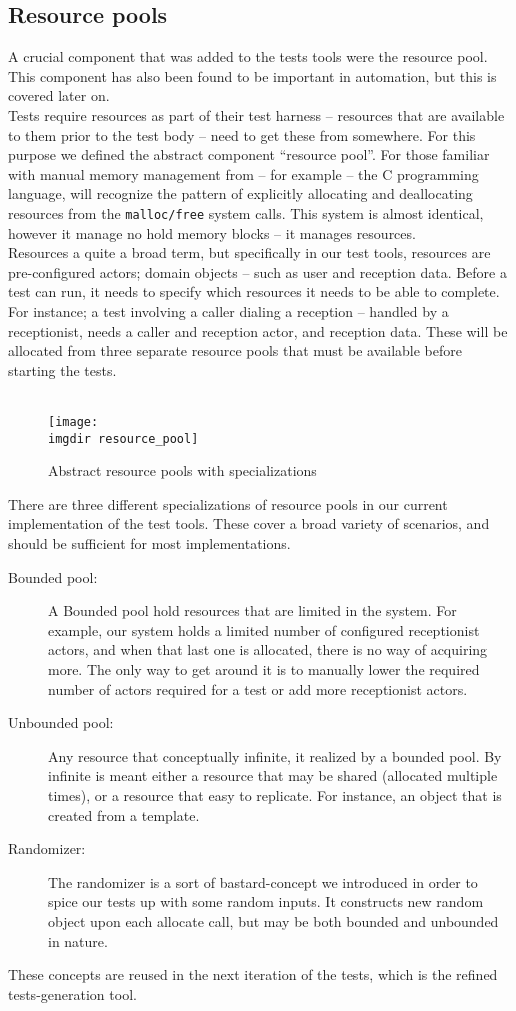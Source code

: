 \subsection{Resource pools}
\label{ssec:resource-pools}
A crucial component that was added to the tests tools were the resource pool. This component has also been found to be important in automation, but this is covered later on.\\
Tests require resources as part of their test harness -- resources that are available to them prior to the test body -- need to get these from somewhere. For this purpose we defined the abstract component ``resource pool''. For those familiar with manual memory management from -- for example -- the C programming language, will recognize the pattern of explicitly allocating and deallocating resources from the \texttt{malloc/free} system calls. This system is almost identical, however it manage no hold memory blocks -- it manages resources.\\
Resources a quite a broad term, but specifically in our test tools, resources are pre-configured actors; domain objects -- such as user and reception data. Before a test can run, it needs to specify which resources it needs to be able to complete. For instance; a test involving a caller dialing a reception -- handled by a receptionist, needs a caller and reception actor, and reception data. These will be allocated from three separate resource pools that must be available before starting the tests.\\\\
\begin{figure}[!htbp]
\centering
\texttt{[image: \\imgdir resource\_pool]}
\caption{Abstract resource pools with specializations}
\label{fig:resource_pool}
\end{figure}There are three different specializations of resource pools in our current implementation of the test tools. These cover a broad variety of scenarios, and should be sufficient for most implementations.
\begin{description}
  \item[Bounded pool:] A Bounded pool hold resources that are limited in the system. For example, our system holds a limited number of configured receptionist actors, and when that last one is allocated, there is no way of acquiring more. The only way to get around it is to manually lower the required number of actors required for a test or add more receptionist actors.
  \item[Unbounded pool:] Any resource that conceptually infinite, it realized by a bounded pool. By infinite is meant either a resource that may be shared (allocated multiple times), or a resource that easy to replicate. For instance, an object that is created from a template.
  \item[Randomizer:] The randomizer is a sort of bastard-concept we introduced in order to spice our tests up with some random inputs. It constructs new random object upon each allocate call, but may be both bounded and unbounded in nature.
\end{description}
These concepts are reused in the next iteration of the tests, which is the refined tests-generation tool.

